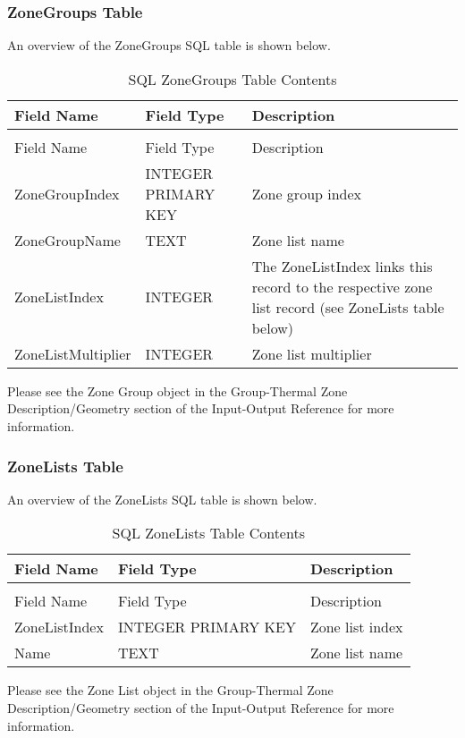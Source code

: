 \subsubsection{ZoneGroups Table}

An overview of the ZoneGroups SQL table is shown below.

\begin{longtable}[c]{p{1.5in}p{1.5in}p{3.0in}}
\caption{SQL ZoneGroups Table Contents \label{table:table-33.-sql-zonegroups-table-contents}} \tabularnewline
\toprule 
Field Name & Field Type & Description \tabularnewline
\midrule
\endfirsthead

\caption[]{SQL ZoneGroups Table Contents} \tabularnewline
\toprule 
Field Name & Field Type & Description \tabularnewline
\midrule
\endhead

ZoneGroupIndex & INTEGER PRIMARY KEY & Zone group index \tabularnewline
ZoneGroupName & TEXT & Zone list name \tabularnewline
ZoneListIndex & INTEGER & The ZoneListIndex links this record to the respective zone list record (see ZoneLists table below) \tabularnewline
ZoneListMultiplier & INTEGER & Zone list multiplier \tabularnewline
\bottomrule
\end{longtable}

Please see the Zone Group object in the Group-Thermal Zone Description/Geometry section of the Input-Output Reference for more information.

\subsubsection{ZoneLists Table}

An overview of the ZoneLists SQL table is shown below.

\begin{longtable}[c]{@{}lll@{}}
\caption{SQL ZoneLists Table Contents \label{table:table-34.-sql-zonelists-table-contents}} \tabularnewline
\toprule 
Field Name & Field Type & Description \tabularnewline
\midrule
\endfirsthead

\caption[]{SQL ZoneLists Table Contents} \tabularnewline
\toprule 
Field Name & Field Type & Description \tabularnewline
\midrule
\endhead

ZoneListIndex & INTEGER PRIMARY KEY & Zone list index \tabularnewline
Name & TEXT & Zone list name \tabularnewline
\bottomrule
\end{longtable}

Please see the Zone List object in the Group-Thermal Zone Description/Geometry section of the Input-Output Reference for more information.

